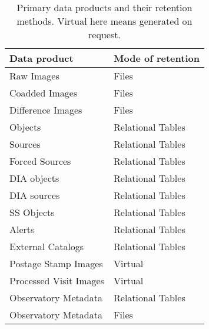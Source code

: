 
\begin{table}
\caption{Primary data products and their retention methods. Virtual here means generated on request. \label{tab:prods}}
\begin{center}
\begin{tabular}{|l|l|}\hline
{\bf Data product}&{\bf  Mode of retention }\\\hline
Raw Images  & Files \\\hline
Coadded Images & Files \\\hline
Difference Images  & Files \\\hline
Objects & Relational Tables \\\hline
Sources  & Relational Tables \\\hline
Forced Sources & Relational Tables \\\hline
DIA objects & Relational Tables \\\hline
DIA sources  & Relational Tables \\\hline
SS Objects  & Relational Tables \\\hline
Alerts & Relational Tables \\\hline
External Catalogs & Relational Tables \\\hline
Postage Stamp Images & Virtual \\\hline
Processed Visit Images & Virtual \\\hline
Observatory Metadata  & Relational Tables \\\hline
Observatory Metadata & Files \\\hline
      \end{tabular}
\end{center}
\end{table}
